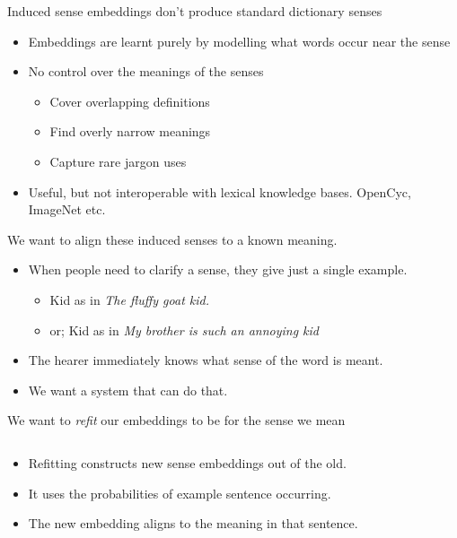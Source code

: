 \documentclass[dvipsnames]{beamer}
\newcommand{\fitcolumn}[1]{
	\begin{column}{0.5\textwidth}
		\begin{adjustbox}{max width=\columnwidth}
			#1
		\end{adjustbox}
	\end{column}%
}
\newcommand{\inputcolumn}[1]{%
	\fitcolumn{}
}
\begin{document}
\begin{frame}{Induced sense embeddings don't produce standard dictionary senses}
	 \begin{itemize}
	 	\item<1-> Embeddings are learnt purely by modelling what words occur near the sense
	 	\item<2-> No control over the meanings of the senses \begin{itemize}
	 		\item Cover overlapping definitions
	 		\item Find overly narrow meanings
	 		\item Capture rare jargon uses
	 	\end{itemize}
		\item<3-> Useful, but not interoperable with lexical knowledge bases. OpenCyc, ImageNet etc.	
	 \end{itemize}
\end{frame}

\begin{frame}{We want to align these induced senses to a known meaning.}
 \begin{itemize}
 	\item When people need to clarify a sense, they give just a single example.
 	\begin{itemize}
 		\item Kid as in \emph{The fluffy goat kid.}
 		\item or; Kid as in \emph{My brother is such an annoying kid}
 	\end{itemize}
	 \item The hearer immediately knows what sense of the word is meant.
	 \item We want a system that can do that.
 \end{itemize}	
\end{frame}


\begin{frame}[label=refittingslide]{We want to \emph{refit}  our embeddings to be for the sense we mean}
	\begin{columns}[T]
		\begin{column}{0.5\textwidth}
			\begin{itemize}
				\item \alert{Refitting} constructs new sense embeddings out of the old.
				\item It uses the \alert{probabilities} of example sentence occurring.
				\item The new embedding aligns to the meaning in \alert{that sentence}.
			\end{itemize}			
		\end{column}
		
		\inputcolumn{../figs/refitting.tex}
	\end{columns}
\end{frame}
\end{document}
